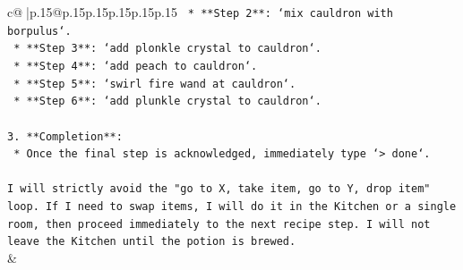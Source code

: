 \documentclass{article}
\begin{document}
{\begin{supertabular}{c@{$\;$}|p{.15\linewidth}@{}p{.15\linewidth}p{.15\linewidth}p{.15\linewidth}p{.15\linewidth}p{.15\linewidth}}
{{{\texttt{    *   **Step 2**: `mix cauldron with borpulus`.} \\
\texttt{    *   **Step 3**: `add plonkle crystal to cauldron`.} \\
\texttt{    *   **Step 4**: `add peach to cauldron`.} \\
\texttt{    *   **Step 5**: `swirl fire wand at cauldron`.} \\
\texttt{    *   **Step 6**: `add plunkle crystal to cauldron`.} \\
\\ 
\texttt{3.  **Completion**:} \\
\texttt{    *   Once the final step is acknowledged, immediately type `> done`.} \\
\\ 
\texttt{I will strictly avoid the "go to X, take item, go to Y, drop item" loop. If I need to swap items, I will do it in the Kitchen or a single room, then proceed immediately to the next recipe step. I will not leave the Kitchen until the potion is brewed.} \\
            }
        }
    }
    & \\ \\

\end{supertabular}
}
\end{document}
